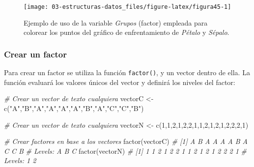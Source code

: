 \documentclass[
]{article}
\newenvironment{Shaded}{\begin{snugshade}}{\end{snugshade}}
\newcommand{\CommentTok}[1]{\textcolor[rgb]{0.56,0.35,0.01}{\textit{#1}}}
\newcommand{\DecValTok}[1]{\textcolor[rgb]{0.00,0.00,0.81}{#1}}
\newcommand{\FunctionTok}[1]{\textcolor[rgb]{0.00,0.00,0.00}{#1}}
\newcommand{\NormalTok}[1]{#1}
\newcommand{\OtherTok}[1]{\textcolor[rgb]{0.56,0.35,0.01}{#1}}
\newcommand{\StringTok}[1]{\textcolor[rgb]{0.31,0.60,0.02}{#1}}
\theoremstyle{definition}
\theoremstyle{definition}
\theoremstyle{definition}
\theoremstyle{definition}
\theoremstyle{remark}
\begin{document}
\begin{figure}

{\centering \texttt{[image: 03-estructuras-datos\_files/figure-latex/figura45-1]} 

}

\caption{Ejemplo de uso de la variable \emph{Grupos} (factor) empleada para colorear los puntos del gráfico de enfrentamiento de \emph{Pétalo} y \emph{Sépalo}.}\label{fig:figura45}
\end{figure}

\hypertarget{crear-un-factor}{%
\subsubsection{Crear un factor}\label{crear-un-factor}}

Para crear un factor se utiliza la función \texttt{factor()}, y un vector dentro de ella. La función evaluará los valores únicos del vector y definirá los niveles del factor:

\begin{Shaded}
\begin{Highlighting}[]
\CommentTok{\# Crear un vector de texto cualquiera }
\NormalTok{vectorC }\OtherTok{\textless{}{-}} \FunctionTok{c}\NormalTok{(}\StringTok{"A"}\NormalTok{,}\StringTok{"B"}\NormalTok{,}\StringTok{"A"}\NormalTok{,}\StringTok{"A"}\NormalTok{,}\StringTok{"A"}\NormalTok{,}\StringTok{"A"}\NormalTok{,}\StringTok{"B"}\NormalTok{,}\StringTok{"A"}\NormalTok{,}\StringTok{"C"}\NormalTok{,}\StringTok{"C"}\NormalTok{,}\StringTok{"B"}\NormalTok{)}

\CommentTok{\# Crear un vector de texto cualquiera}
\NormalTok{vectorN }\OtherTok{\textless{}{-}} \FunctionTok{c}\NormalTok{(}\DecValTok{1}\NormalTok{,}\DecValTok{1}\NormalTok{,}\DecValTok{2}\NormalTok{,}\DecValTok{1}\NormalTok{,}\DecValTok{2}\NormalTok{,}\DecValTok{2}\NormalTok{,}\DecValTok{1}\NormalTok{,}\DecValTok{1}\NormalTok{,}\DecValTok{2}\NormalTok{,}\DecValTok{1}\NormalTok{,}\DecValTok{2}\NormalTok{,}\DecValTok{1}\NormalTok{,}\DecValTok{2}\NormalTok{,}\DecValTok{2}\NormalTok{,}\DecValTok{2}\NormalTok{,}\DecValTok{1}\NormalTok{)}

\CommentTok{\# Crear factores en base a los vectores}
\FunctionTok{factor}\NormalTok{(vectorC)}
\CommentTok{\#  [1] A B A A A A B A C C B}
\CommentTok{\# Levels: A B C}
\FunctionTok{factor}\NormalTok{(vectorN)}
\CommentTok{\#  [1] 1 1 2 1 2 2 1 1 2 1 2 1 2 2 2 1}
\CommentTok{\# Levels: 1 2}
\end{Highlighting}
\end{Shaded}
\end{document}
